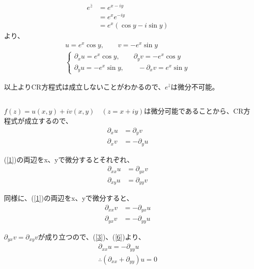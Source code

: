 \documentclass[dvipdfmx,a4paper]{jsarticle}
\begin{document}
\begin{align*}
e^{\bar z} &= e^{x-iy} \\
&= e^xe^{-iy}\\
&= e^x(\cos{y} - i\sin{y})
\end{align*}
より、
\begin{align*}
u = e^x\cos{y}, \qquad v = -e^x\sin{y}\\
\begin{cases}
\partial_x u = e^x\cos{y}, \qquad \partial_y v = -e^x\cos{y}\\
\partial_y u = -e^x\sin{y}, \qquad -\partial_x v = e^x\sin{y}
\end{cases}
\end{align*}

以上よりCR方程式は成立しないことがわかるので、$e^{\bar z}$は微分不可能。\\

\subsection{}
\subsubsection{}
$f(z) = u(x,y) + iv(x,y)\quad(z =x +iy)$は微分可能であることから、CR方程式が成立するので、
\begin{eqnarray}
\label{1}
\partial_x u &= \partial_y v\\
\label{2}
\partial_x v &= -\partial_y u
\end{eqnarray}

(\ref{1})の両辺をx、yで微分するとそれぞれ、
\begin{eqnarray}
\label{3}
\partial_{xx} u &= \partial_{yx} v\\
\label{4}
\partial_{xy} u &= \partial_{yy} v
\end{eqnarray}

同様に、(\ref{1})の両辺をx、yで微分すると、
\begin{eqnarray}
\label{5}
\partial_{xx} v &= -\partial_{yx} u\\
\label{6}
\partial_{yx} v &= -\partial_{yy} u
\end{eqnarray}

$\partial_{yx} v = \partial_{xy} v$が成り立つので、(\ref{3})、(\ref{6})より、
\begin{eqnarray}
\partial_{xx} u = -\partial_{yy} u \nonumber\\
\label{7}
\therefore (\partial_{xx}+\partial_{yy}) u = 0
\end{eqnarray}
\end{document}
